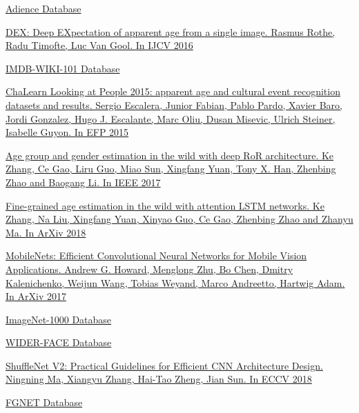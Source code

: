 \begin{thebibliography}{0}
    \hypertarget{adience}{}
    \href{https://talhassner.github.io/home/projects/Adience/Adience-data.html}
    {
        Adience Database
    }

    \hypertarget{imdb}{}
    \href{https://data.vision.ee.ethz.ch/cvl/publications/papers/proceedings/eth_biwi_01229.pdf}
    {
        DEX: Deep EXpectation of apparent age from a single image.
        Rasmus Rothe, Radu Timofte, Luc Van Gool.
        In IJCV 2016
    }

    \hypertarget{imdb_db}{}
    \href{https://data.vision.ee.ethz.ch/cvl/rrothe/imdb-wiki/}
    {
        IMDB-WIKI-101 Database
    }

    \hypertarget{lap}{}
    \href{http://refbase.cvc.uab.es/files/EFP2015.pdf}
    {
        ChaLearn Looking at People 2015: apparent age and cultural event recognition datasets and results.
        Sergio Escalera, Junior Fabian, Pablo Pardo, Xavier Baro, Jordi Gonzalez, Hugo J. Escalante, Marc Oliu, Dusan Misevic, Ulrich Steiner, Isabelle Guyon.
        In EFP 2015
    }

    \hypertarget{ror}{}
    \href{https://arxiv.org/pdf/1710.02985.pdf}
    {
        Age group and gender estimation in the wild with deep RoR architecture.
        Ke Zhang, Ce Gao, Liru Guo, Miao Sun, Xingfang Yuan, Tony X. Han, Zhenbing Zhao and Baogang Li.
        In IEEE 2017
    }

    \hypertarget{lstm}{}
    \href{https://arxiv.org/pdf/1805.10445.pdf}
    {
        Fine-grained age estimation in the wild with attention LSTM networks.
        Ke Zhang, Na Liu, Xingfang Yuan, Xinyao Guo, Ce Gao, Zhenbing Zhao and Zhanyu Ma.
        In ArXiv 2018
    }

    \hypertarget{mobile}{}
    \href{https://arxiv.org/abs/1704.04861}
    {
        MobileNets: Efficient Convolutional Neural Networks for Mobile Vision Applications.
        Andrew G. Howard, Menglong Zhu, Bo Chen, Dmitry Kalenichenko, Weijun Wang, Tobias Weyand, Marco Andreetto, Hartwig Adam.
        In ArXiv 2017
    }

    \hypertarget{imagenet}{}
    \href{http://www.image-net.org/}
    {
        ImageNet-1000 Database
    }

    \hypertarget{wider}{}
    \href{http://shuoyang1213.me/WIDERFACE/}
    {
        WIDER-FACE Database
    }

    \hypertarget{shuffle}{}
    \href{https://arxiv.org/abs/1807.11164}
    {
        ShuffleNet V2: Practical Guidelines for Efficient CNN Architecture Design.
        Ningning Ma, Xiangyu Zhang, Hai-Tao Zheng, Jian Sun.
        In ECCV 2018
    }

    \hypertarget{fgnet}{}
    \href{https://yanweifu.github.io/FG_NET_data/}
    {
        FGNET Database
    }

\end{thebibliography}